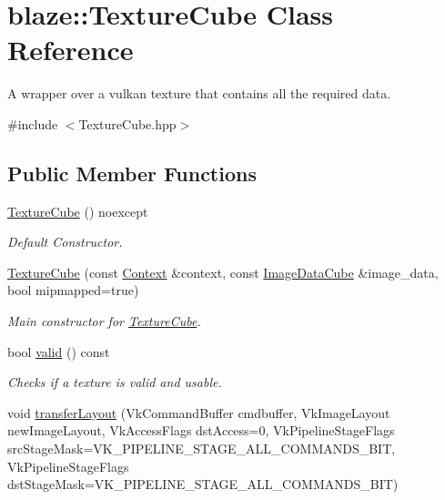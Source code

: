 \hypertarget{classblaze_1_1TextureCube}{}\section{blaze\+:\+:Texture\+Cube Class Reference}
\label{classblaze_1_1TextureCube}


A wrapper over a vulkan texture that contains all the required data.  




{\ttfamily \#include $<$Texture\+Cube.\+hpp$>$}

\subsection*{Public Member Functions}
\begin{DoxyCompactItemize}
\item 
\mbox{\label{classblaze_1_1TextureCube_aafca1ecaae4a7d9d8515603c5d25c7af}} 
\hyperlink{classblaze_1_1TextureCube_aafca1ecaae4a7d9d8515603c5d25c7af}{Texture\+Cube} () noexcept
\begin{DoxyCompactList}\small\item\em Default Constructor. \end{DoxyCompactList}\item 
\hyperlink{classblaze_1_1TextureCube_a3c6b2d3d301a4db95fb4a9abb4e9220a}{Texture\+Cube} (const \hyperlink{classblaze_1_1Context}{Context} \&context, const \hyperlink{structblaze_1_1ImageDataCube}{Image\+Data\+Cube} \&image\+\_\+data, bool mipmapped=true)
\begin{DoxyCompactList}\small\item\em Main constructor for \hyperlink{classblaze_1_1TextureCube}{Texture\+Cube}. \end{DoxyCompactList}\item 
bool \hyperlink{classblaze_1_1TextureCube_aa1a49eebe8b2a63878b52321149d4c5b}{valid} () const
\begin{DoxyCompactList}\small\item\em Checks if a texture is valid and usable. \end{DoxyCompactList}\item 
void \hyperlink{classblaze_1_1TextureCube_aafdee6f11a7272e2ff8ccd8514177500}{transfer\+Layout} (Vk\+Command\+Buffer cmdbuffer, Vk\+Image\+Layout new\+Image\+Layout, Vk\+Access\+Flags dst\+Access=0, Vk\+Pipeline\+Stage\+Flags src\+Stage\+Mask=V\+K\+\_\+\+P\+I\+P\+E\+L\+I\+N\+E\+\_\+\+S\+T\+A\+G\+E\+\_\+\+A\+L\+L\+\_\+\+C\+O\+M\+M\+A\+N\+D\+S\+\_\+\+B\+IT, Vk\+Pipeline\+Stage\+Flags dst\+Stage\+Mask=V\+K\+\_\+\+P\+I\+P\+E\+L\+I\+N\+E\+\_\+\+S\+T\+A\+G\+E\+\_\+\+A\+L\+L\+\_\+\+C\+O\+M\+M\+A\+N\+D\+S\+\_\+\+B\+IT)

\end{DoxyCompactItemize}

